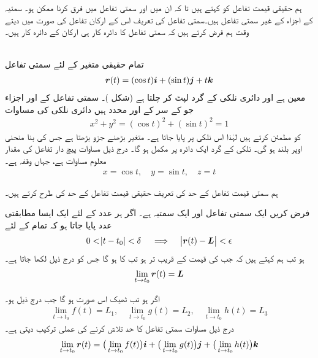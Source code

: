 ہم حقیقی قیمت تفاعل کو  کہتے ہیں تا کہ ان میں اور سمتی تفاعل میں فرق کرنا ممکن ہو۔  سمتیہ  کے اجزاء   کے غیر سمتی تفاعل ہیں۔سمتی تفاعل کی تعریف  اس کے  ارکان تفاعل کی صورت میں دیتے وقت ہم فرض کرتے ہیں کہ   سمتی تفاعل کا دائرہ کار ہی  ارکان کے دائرہ کار   ہیں۔

\\
تمام حقیقی متغیر   کے لئے سمتی تفاعل
\begin{align*}
{\ensuremath{{\boldsymbol{r}}}}(t)=(\cos t){\boldsymbol{i}}+(\sin t){\boldsymbol{j}}+t{\boldsymbol{k}}
\end{align*}
معین ہے اور     دائری نلکی  کے گرد  لپٹ کر چلتا ہے (شکل )۔  سمتی تفاعل  کے  اور  اجزاء  جو  کے سر  کے   اور  محدد ہیں   دائری نلکی  کی مساوات
\begin{align*}
x^2+y^2=(\cos t)^2+(\sin t)^2=1
\end{align*}
کو مطمئن کرتے ہیں لہٰذا  اس نلکی پر پایا جاتا ہے۔ متغیر  بڑھنے    جزو بڑھتا ہے  جس کی بنا   منحنی   اوپر بلند ہو گی۔ نلکی کے گرد ایک دائرہ   پر مکمل ہو گا۔  درج ذیل مساوات  پیچ دار تفاعل  کی مقدار معلوم  مساوات ہے، جہاں وقفہ  ہے۔
\begin{align*}
x=\cos t,\quad y=\sin t,\quad z=t
\end{align*}

ہم  سمتی  قیمت تفاعل کے حد کی تعریف  حقیقی قیمت تفاعل کے حد  کی طرح کرتے ہیں۔

فرض کریں  ایک سمتی تفاعل اور  ایک سمتیہ ہے۔ اگر  ہر عدد  کے لئے   ایک ایسا مطابقتی  عدد  پایا جاتا ہو کہ تمام  کے لئے
\begin{align*}
0<\abs{t-t_0}<\delta\quad \implies \quad \abs{{{\boldsymbol{r}}}(t)-{{\boldsymbol{L}}}}<\epsilon
\end{align*}
ہو تب ہم کہتے ہیں کہ جب   کی قیمت  کے قریب تر ہو تب   کا    ہو گا جس کو درج ذیل لکھا جاتا ہے۔
\begin{align*}
\lim_{t\to t_0}{{\boldsymbol{r}}}(t)={{\boldsymbol{L}}}
\end{align*}

اگر  ہو تب  ٹھیک اس صورت ہو گا جب درج ذیل ہو۔
\begin{align*}
\lim_{t\to t_0}f(t)=L_1,\quad \lim_{t\to t_0}g(t)=L_2,\quad \lim_{t\to t_0}h(t)=L_3
\end{align*}
درج ذیل مساوات سمتی تفاعل کا حد تلاش کرنے کی  عملی ترکیب دیتی ہے۔
\begin{align}
\lim_{t\to t_0}{{\boldsymbol{r}}}(t)=\big(\lim_{t\to t_0}f(t)\big){\boldsymbol{i}}+\big(\lim_{t\to t_0}g(t)\big){\boldsymbol{j}}+\big(\lim_{t\to t_0}h(t)\big){\boldsymbol{k}}
\end{align}


